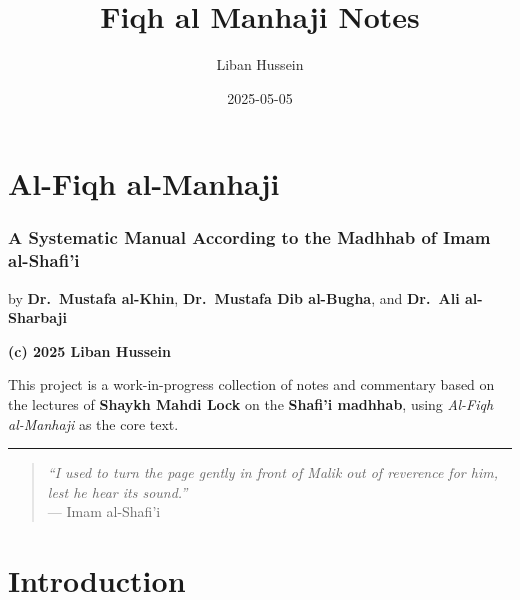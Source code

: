 \documentclass[
  a4paper,
  DIV=11,
  numbers=noendperiod]{scrartcl}
\title{Fiqh al Manhaji Notes}
\author{Liban Hussein}
\date{2025-05-05}
\renewcommand*\contentsname{Table of contents}
\newcommand\contentsname{Table of contents}
\begin{document}
\maketitle

\renewcommand*\contentsname{Table of contents}
{
\hypersetup{linkcolor=}
\setcounter{tocdepth}{3}
\tableofcontents
}

\section{Al-Fiqh al-Manhaji}\label{al-fiqh-al-manhaji}

\subsubsection{A Systematic Manual According to the Madhhab of Imam
al-Shafi'i}\label{a-systematic-manual-according-to-the-madhhab-of-imam-al-shafii}

by \textbf{Dr.~Mustafa al-Khin}, \textbf{Dr.~Mustafa Dib al-Bugha}, and
\textbf{Dr.~Ali al-Sharbaji}

\textbf{(c) 2025 Liban Hussein}

This project is a work-in-progress collection of notes and commentary
based on the lectures of \textbf{Shaykh Mahdi Lock} on the
\textbf{Shafi'i madhhab}, using \emph{Al-Fiqh al-Manhaji} as the core
text.

\begin{center}\rule{0.5\linewidth}{0.5pt}\end{center}

\begin{tcolorbox}[enhanced jigsaw, colframe=quarto-callout-note-color-frame, breakable, toptitle=1mm, coltitle=black, opacityback=0, bottomrule=.15mm, left=2mm, bottomtitle=1mm, title=\textcolor{quarto-callout-note-color}{\faInfo}\hspace{0.5em}{\textbf{Quote}}, rightrule=.15mm, opacitybacktitle=0.6, colback=white, colbacktitle=quarto-callout-note-color!10!white, arc=.35mm, toprule=.15mm, titlerule=0mm, leftrule=.75mm]

\begin{quote}
\emph{``I used to turn the page gently in front of Malik out of
reverence for him, lest he hear its sound.''}\\
--- Imam al-Shafi'i
\end{quote}

\end{tcolorbox}

\section{Introduction}\label{sec-intro}
\end{document}
